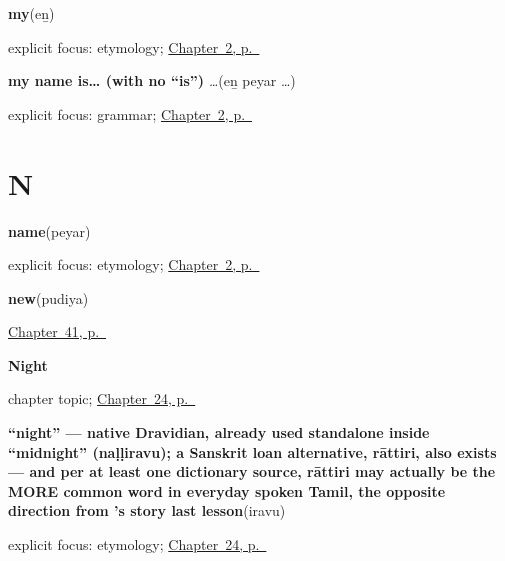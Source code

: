 \noindent\begin{minipage}[t]{\linewidth}
\raggedright
\textbf{my}\enspace\emph{}\enspace(eṉ)\par
\footnotesize explicit focus: etymology; \hyperref[ch:introductions]{Chapter~2, p.~\pageref*{ch:introductions}}
\end{minipage}\par\smallskip

\noindent\begin{minipage}[t]{\linewidth}
\raggedright
\textbf{my name is… (with no \textquotedblleft{}is\textquotedblright{})}\enspace\emph{  …}\enspace(eṉ peyar …)\par
\footnotesize explicit focus: grammar; \hyperref[ch:introductions]{Chapter~2, p.~\pageref*{ch:introductions}}
\end{minipage}\par\smallskip

\section*{N}

\noindent\begin{minipage}[t]{\linewidth}
\raggedright
\textbf{name}\enspace\emph{}\enspace(peyar)\par
\footnotesize explicit focus: etymology; \hyperref[ch:introductions]{Chapter~2, p.~\pageref*{ch:introductions}}
\end{minipage}\par\smallskip

\noindent\begin{minipage}[t]{\linewidth}
\raggedright
\textbf{new}\enspace\emph{}\enspace(pudiya)\par
\footnotesize \hyperref[ch:ta-describing-things]{Chapter~41, p.~\pageref*{ch:ta-describing-things}}
\end{minipage}\par\smallskip

\noindent\begin{minipage}[t]{\linewidth}
\raggedright
\textbf{Night}\par
\footnotesize chapter topic; \hyperref[ch:ta-night]{Chapter~24, p.~\pageref*{ch:ta-night}}
\end{minipage}\par\smallskip

\noindent\begin{minipage}[t]{\linewidth}
\raggedright
\textbf{\textquotedblleft{}night\textquotedblright{} — native Dravidian, already used standalone inside \textquotedblleft{}midnight\textquotedblright{} (naḷḷiravu); a Sanskrit loan alternative, rāttiri, also exists — and per at least one dictionary source, rāttiri may actually be the MORE common word in everyday spoken Tamil, the opposite direction from 's story last lesson}\enspace\emph{}\enspace(iravu)\par
\footnotesize explicit focus: etymology; \hyperref[ch:ta-night]{Chapter~24, p.~\pageref*{ch:ta-night}}
\end{minipage}\par\smallskip

